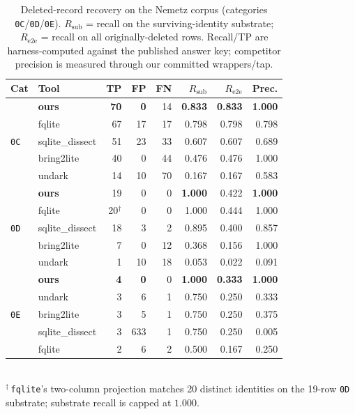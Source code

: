 \documentclass[10pt,a4paper]{article}
\newcommand{\code}[1]{\texttt{#1}}
\begin{document}
\begin{table}[t]
\centering\small
\caption{Deleted-record recovery on the Nemetz corpus (categories \code{0C}/\code{0D}/\code{0E}).
$R_{\mathrm{sub}}$ = recall on the surviving-identity substrate; $R_{\mathrm{e2e}}$
= recall on all originally-deleted rows. Recall/TP are harness-computed against the
published answer key; competitor precision is measured through our committed
wrappers/tap.}
\label{tab:headtohead}
\setlength{\tabcolsep}{3.5pt}
\begin{tabular}{@{}llrrrrrr@{}}
\toprule
Cat & Tool & TP & FP & FN & $R_{\mathrm{sub}}$ & $R_{\mathrm{e2e}}$ & Prec. \\
\midrule
\multirow{5}{*}{\code{0C}}
 & \textbf{ours}   & \textbf{70} & \textbf{0}  & 14 & \textbf{0.833} & \textbf{0.833} & \textbf{1.000} \\
 & fqlite          & 67 & 17 & 17 & 0.798 & 0.798 & 0.798 \\
 & sqlite\_dissect & 51 & 23 & 33 & 0.607 & 0.607 & 0.689 \\
 & bring2lite      & 40 & 0  & 44 & 0.476 & 0.476 & 1.000 \\
 & undark          & 14 & 10 & 70 & 0.167 & 0.167 & 0.583 \\
\midrule
\multirow{5}{*}{\code{0D}}
 & \textbf{ours}   & 19 & 0 & 0 & \textbf{1.000} & 0.422 & \textbf{1.000} \\
 & fqlite          & 20$^\dagger$ & 0 & 0 & 1.000 & 0.444 & 1.000 \\
 & sqlite\_dissect & 18 & 3 & 2 & 0.895 & 0.400 & 0.857 \\
 & bring2lite      & 7  & 0 & 12 & 0.368 & 0.156 & 1.000 \\
 & undark          & 1  & 10 & 18 & 0.053 & 0.022 & 0.091 \\
\midrule
\multirow{5}{*}{\code{0E}}
 & \textbf{ours}   & \textbf{4} & \textbf{0} & 0 & \textbf{1.000} & \textbf{0.333} & \textbf{1.000} \\
 & undark          & 3 & 6 & 1 & 0.750 & 0.250 & 0.333 \\
 & bring2lite      & 3 & 5 & 1 & 0.750 & 0.250 & 0.375 \\
 & sqlite\_dissect & 3 & 633 & 1 & 0.750 & 0.250 & 0.005 \\
 & fqlite          & 2 & 6 & 2 & 0.500 & 0.167 & 0.250 \\
\bottomrule
\end{tabular}
\\[2pt]
{\footnotesize $^\dagger$\,\code{fqlite}'s two-column projection matches 20 distinct
identities on the 19-row \code{0D} substrate; substrate recall is capped at $1.000$.}
\end{table}
\end{document}

